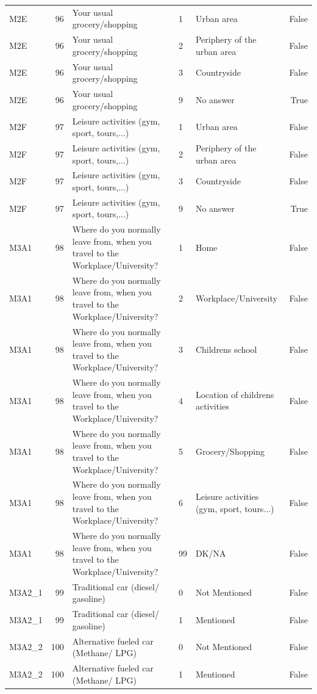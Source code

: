\begin{tabular}{lrlllr}
M2E & 96 & Your usual grocery/shopping & 1 & Urban area & False \\
M2E & 96 & Your usual grocery/shopping & 2 & Periphery of the urban area & False \\
M2E & 96 & Your usual grocery/shopping & 3 & Countryside & False \\
M2E & 96 & Your usual grocery/shopping & 9 & No answer & True \\
M2F & 97 & Leisure activities (gym, sport, tours,...) & 1 & Urban area & False \\
M2F & 97 & Leisure activities (gym, sport, tours,...) & 2 & Periphery of the urban area & False \\
M2F & 97 & Leisure activities (gym, sport, tours,...) & 3 & Countryside & False \\
M2F & 97 & Leisure activities (gym, sport, tours,...) & 9 & No answer & True \\
M3A1 & 98 & Where do you normally leave from, when you travel to the Workplace/University? & 1 & Home & False \\
M3A1 & 98 & Where do you normally leave from, when you travel to the Workplace/University? & 2 & Workplace/University & False \\
M3A1 & 98 & Where do you normally leave from, when you travel to the Workplace/University? & 3 & Childrens school & False \\
M3A1 & 98 & Where do you normally leave from, when you travel to the Workplace/University? & 4 & Location of childrens activities & False \\
M3A1 & 98 & Where do you normally leave from, when you travel to the Workplace/University? & 5 & Grocery/Shopping & False \\
M3A1 & 98 & Where do you normally leave from, when you travel to the Workplace/University? & 6 & Leisure activities (gym, sport, tours...) & False \\
M3A1 & 98 & Where do you normally leave from, when you travel to the Workplace/University? & 99 & DK/NA & False \\
M3A2_1 & 99 & Traditional car (diesel/ gasoline) & 0 & Not Mentioned & False \\
M3A2_1 & 99 & Traditional car (diesel/ gasoline) & 1 & Mentioned & False \\
M3A2_2 & 100 & Alternative fueled car (Methane/ LPG) & 0 & Not Mentioned & False \\
M3A2_2 & 100 & Alternative fueled car (Methane/ LPG) & 1 & Mentioned & False \\

\end{tabular}
